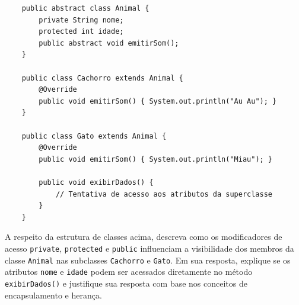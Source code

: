 \documentclass[12pt,a4paper]{article}
\begin{document}
\begin{enumerate}
\begin{center}
    \end{center}

    \begin{verbatim}
    public abstract class Animal {
        private String nome;
        protected int idade;
        public abstract void emitirSom();
    }

    public class Cachorro extends Animal {
        @Override
        public void emitirSom() { System.out.println("Au Au"); }
    }

    public class Gato extends Animal {
        @Override
        public void emitirSom() { System.out.println("Miau"); }
        
        public void exibirDados() {
            // Tentativa de acesso aos atributos da superclasse
        }
    }
    \end{verbatim}

    A respeito da estrutura de classes acima, descreva como os modificadores de acesso \texttt{private}, \texttt{protected} e \texttt{public} influenciam a visibilidade dos membros da classe \texttt{Animal} nas subclasses \texttt{Cachorro} e \texttt{Gato}. Em sua resposta, explique se os atributos \texttt{nome} e \texttt{idade} podem ser acessados diretamente no método \texttt{exibirDados()} e justifique sua resposta com base nos conceitos de encapsulamento e herança.
    

\end{enumerate}
\end{document}
